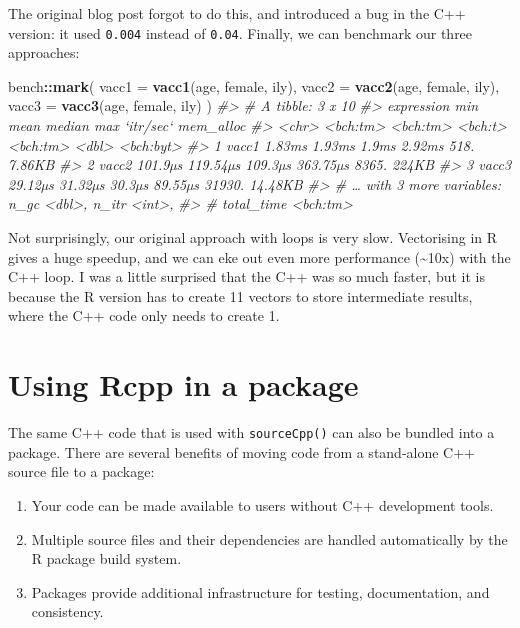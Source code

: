 \documentclass[]{book}
\newenvironment{Shaded}{\begin{snugshade}}{\end{snugshade}}
\newcommand{\CommentTok}[1]{\textcolor[rgb]{0.37,0.37,0.37}{\textit{#1}}}
\newcommand{\DataTypeTok}[1]{\textcolor[rgb]{0.27,0.27,0.27}{#1}}
\newcommand{\KeywordTok}[1]{\textcolor[rgb]{0.27,0.27,0.27}{\textbf{#1}}}
\newcommand{\NormalTok}[1]{#1}
\newcommand{\OperatorTok}[1]{\textcolor[rgb]{0.43,0.43,0.43}{\textbf{#1}}}
\begin{document}
The original blog post forgot to do this, and introduced a bug in the C++ version: it used \texttt{0.004} instead of \texttt{0.04}. Finally, we can benchmark our three approaches:

\begin{Shaded}
\begin{Highlighting}[]
\NormalTok{bench}\OperatorTok{::}\KeywordTok{mark}\NormalTok{(}
  \DataTypeTok{vacc1 =} \KeywordTok{vacc1}\NormalTok{(age, female, ily),}
  \DataTypeTok{vacc2 =} \KeywordTok{vacc2}\NormalTok{(age, female, ily),}
  \DataTypeTok{vacc3 =} \KeywordTok{vacc3}\NormalTok{(age, female, ily)}
\NormalTok{)}
\CommentTok{#> # A tibble: 3 x 10}
\CommentTok{#>   expression      min     mean  median      max `itr/sec` mem_alloc}
\CommentTok{#>   <chr>      <bch:tm> <bch:tm> <bch:t> <bch:tm>     <dbl> <bch:byt>}
\CommentTok{#> 1 vacc1        1.83ms   1.93ms   1.9ms   2.92ms      518.    7.86KB}
\CommentTok{#> 2 vacc2       101.9µs 119.54µs 109.3µs 363.75µs     8365.     224KB}
\CommentTok{#> 3 vacc3       29.12µs  31.32µs  30.3µs  89.55µs    31930.   14.48KB}
\CommentTok{#> # … with 3 more variables: n_gc <dbl>, n_itr <int>,}
\CommentTok{#> #   total_time <bch:tm>}
\end{Highlighting}
\end{Shaded}

Not surprisingly, our original approach with loops is very slow. Vectorising in R gives a huge speedup, and we can eke out even more performance (\textasciitilde{}10x) with the C++ loop. I was a little surprised that the C++ was so much faster, but it is because the R version has to create 11 vectors to store intermediate results, where the C++ code only needs to create 1.

\hypertarget{rcpp-package}{%
\section{Using Rcpp in a package}\label{rcpp-package}}

The same C++ code that is used with \texttt{sourceCpp()} can also be bundled into a package. There are several benefits of moving code from a stand-alone C++ source file to a package: 

\begin{enumerate}
\def\labelenumi{\arabic{enumi}.}
\item
  Your code can be made available to users without C++ development tools.
\item
  Multiple source files and their dependencies are handled automatically by
  the R package build system.
\item
  Packages provide additional infrastructure for testing, documentation, and
  consistency.
\end{enumerate}
\end{document}
